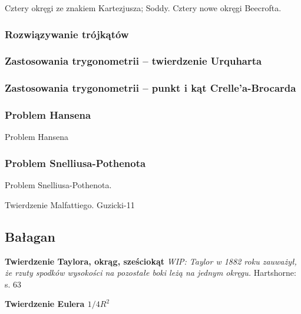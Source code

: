 Cztery okręgi ze znakiem Kartezjusza; Soddy.
Cztery nowe okręgi Beecrofta.

\subsubsection{Rozwiązywanie trójkątów}


\subsubsection{Zastosowania trygonometrii -- twierdzenie Urquharta}


\subsubsection{Zastosowania trygonometrii -- punkt i kąt Crelle'a-Brocarda}


\subsubsection{Problem Hansena}
Problem Hansena
%

\subsubsection{Problem Snelliusa-Pothenota}
Problem Snelliusa-Pothenota.
%


Twierdzenie Malfattiego.
Guzicki-11

\subsection{Bałagan}

\textbf{Twierdzenie Taylora, okrąg, sześciokąt}
{
    \emph{WIP: Taylor w 1882 roku zauważył, że rzuty spodków wysokości na pozostałe boki leżą na jednym okręgu.}
	Hartshorne: s. 63
}

\textbf{Twierdzenie Eulera $1/4R^2$}



%